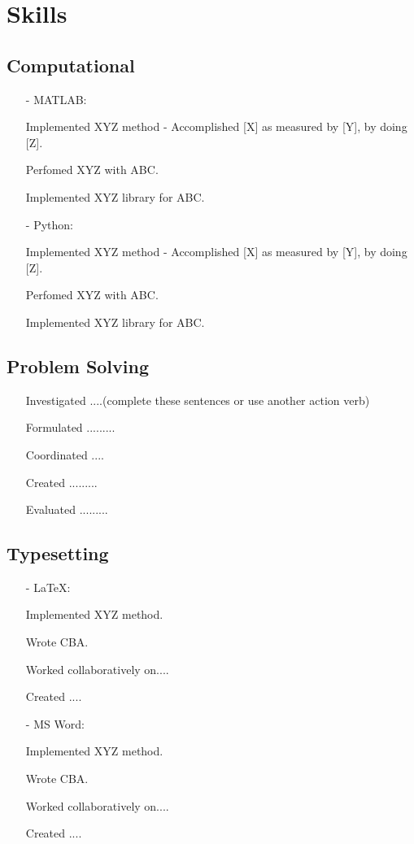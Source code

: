 \documentclass[11pt]{article}
\begin{document}
\section{Skills}
\subsection{Computational}
\begin{itemize}
    \item[-] \textcolor{Sepia}{MATLAB}:
    \item[\checkmark] Implemented XYZ method - Accomplished [X] as measured by [Y], by doing [Z].  
    \item[\checkmark] Perfomed XYZ with ABC. 
    \item[\checkmark] Implemented XYZ library for ABC. 
    \item[-] \textcolor{Sepia}{Python}: 
    \item[\checkmark] Implemented XYZ method - Accomplished [X] as measured by [Y], by doing [Z].  
    \item[\checkmark] Perfomed XYZ with ABC. 
    \item[\checkmark] Implemented XYZ library for ABC.
\end{itemize}
\subsection{Problem Solving}
\begin{itemize}
    \item[\checkmark] Investigated ....(complete these sentences or use another action verb)
    \item[\checkmark] Formulated .........
    \item[\checkmark] Coordinated ....
    \item[\checkmark] Created .........
    \item[\checkmark] Evaluated .........
\end{itemize}
\subsection{Typesetting}
\begin{itemize}
    \item[-] \textcolor{Sepia}{\LaTeX}: 
    \item[\checkmark] Implemented XYZ method. 
    \item[\checkmark] Wrote CBA. 
    \item[\checkmark] Worked collaboratively on.... 
    \item[\checkmark] Created ....
    \item[-] \textcolor{Sepia}{MS Word}:  
    \item[\checkmark] Implemented XYZ method. 
    \item[\checkmark] Wrote CBA. 
    \item[\checkmark] Worked collaboratively on.... 
    \item[\checkmark] Created ....
\end{itemize}
\end{document}
